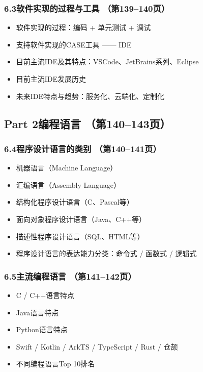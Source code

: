 \documentclass[12pt,a4paper]{ctexart}
\begin{document}
\subsubsection{6.3\quad 软件实现的过程与工具 \hfill（第139--140页）}
\begin{itemize}
    \item 软件实现的过程：编码 + 单元测试 + 调试
    \item 支持软件实现的CASE工具 —— IDE
    \item 目前主流IDE及其特点：VSCode、JetBrains系列、Eclipse
    \item 目前主流IDE发展历史
    \item 未来IDE特点与趋势：服务化、云端化、定制化
\end{itemize}

\subsection{Part 2\quad 编程语言 \hfill（第140--143页）}

\subsubsection{6.4\quad 程序设计语言的类别 \hfill（第140--141页）}
\begin{itemize}
    \item 机器语言（Machine Language）
    \item 汇编语言（Assembly Language）
    \item 结构化程序设计语言（C、Pascal等）
    \item 面向对象程序设计语言（Java、C++等）
    \item 描述性程序设计语言（SQL、HTML等）
    \item 程序设计语言的表达能力分类：命令式 / 函数式 / 逻辑式
\end{itemize}

\subsubsection{6.5\quad 主流编程语言 \hfill（第141--142页）}
\begin{itemize}
    \item C / C++语言特点
    \item Java语言特点
    \item Python语言特点
    \item Swift / Kotlin / ArkTS / TypeScript / Rust / 仓颉
    \item 不同编程语言Top 10排名
\end{itemize}
\end{document}
